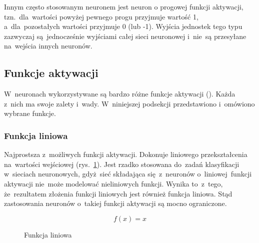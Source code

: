 Innym często stosowanym neuronem jest neuron o progowej funkcji aktywacji, tzn.~dla~wartości powyżej pewnego
progu przyjmuje wartość 1, a~dla~pozostałych wartości przyjmuje 0 (lub -1). Wyjścia jednostek tego typu
zazwyczaj są~jednocześnie wyjściami całej sieci neuronowej i~nie~są przesyłane na~wejścia innych neuronów.

\subsection{Funkcje aktywacji}
W~neuronach wykorzystywane są bardzo różne funkcje aktywacji (\cite{activation-functions}). Każda z~nich ma swoje
zalety i~wady. W~niniejszej podsekcji przedstawiono i~omówiono wybrane funkcje.

\subsubsection{Funkcja liniowa}
Najprostsza z~możliwych funkcji aktywacji. Dokonuje liniowego przekształcenia na~wartości wejściowej
(rys.~\ref{rys:f-liniowa}). Jest rzadko stosowana do~zadań klasyfikacji w~sieciach neuronowych, gdyż~sieć składająca
się~z~neuronów o~liniowej~funkcji aktywacji nie~może modelować nieliniowych funkcji. Wynika to~z~tego, że~rezultatem
złożenia funkcji liniowych jest również funkcja liniowa. Stąd zastosowania neuronów o~takiej funkcji aktywacji są
mocno ograniczone.

\begin{minipage}[t]{\textwidth}
\begin{equation}
f(x)=x
\end{equation}
\begin{figure}[H]
    \centering
    \caption{Funkcja liniowa}
    \label{rys:f-liniowa}

\end{figure}
\end{minipage}


